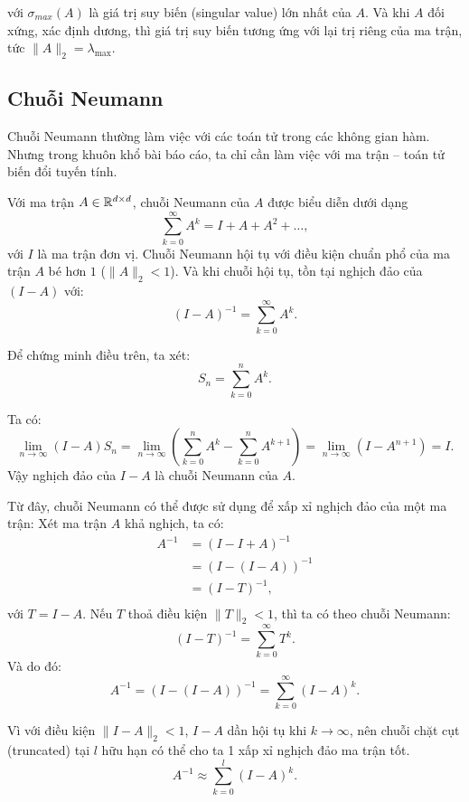với $\sigma_{max} (A)$ là giá trị suy biến (singular value) lớn nhất của $A$. Và khi $A$ đối xứng, xác định dương, thì giá trị suy biến tương ứng với lại trị riêng của ma trận, tức $\|A\|_2 = \lambda_{\max}$.


\subsection{Chuỗi Neumann}
Chuỗi Neumann thường làm việc với các toán tử trong các không gian hàm. Nhưng trong khuôn khổ bài báo cáo, ta chỉ cần làm việc với ma trận -- toán tử biến đổi tuyến tính.

Với ma trận $A \in \mathbb R^{d \times d}$, chuỗi Neumann của $A$ được biểu diễn dưới dạng
\begin{equation*}
    \sum_{k=0}^{\infty} A^k = I + A + A^2 + \dots,
\end{equation*}
với $I$ là ma trận đơn vị.
Chuỗi Neumann hội tụ với điều kiện chuẩn phổ 
của ma trận $A$ bé hơn $1$ ($\|A\|_2 < 1$).
Và khi chuỗi hội tụ, tồn tại nghịch đảo của $(I - A)$ với:
\begin{equation*}
    (I - A)^{-1} = \sum_{k=0}^{\infty} A^k.
\end{equation*}

Để chứng minh điều trên, ta xét:
\[
    S_n = \sum_{k=0}^n A^k.
\]

Ta có:
\[
    \lim_{n \to \infty }(I - A) S_{n}
    =\lim_{n \to \infty} \left(\sum_{k=0}^{n}A^{k} - \sum_{k=0}^{n}A^{k+1}\right)
    =\lim_{n \to \infty} \left(I-A^{n+1}\right) = I.
\]
Vậy nghịch đảo của $I-A$ là chuỗi Neumann của $A$.

Từ đây, chuỗi Neumann có thể được sử dụng để xấp xỉ nghịch đảo của một ma trận: Xét ma trận $A$ khả nghịch, ta có:
\begin{equation*}
    \begin{split}
        A^{-1} &= (I - I + A)^{-1}\\
        &= (I - (I - A))^{-1}\\
        &= (I - T)^{-1}, \\
    \end{split}
\end{equation*}
với $T = I - A$. Nếu $T$ thoả điều kiện $\|T\|_2 < 1$, thì ta có theo chuỗi Neumann:
\[
    (I - T)^{-1} = \sum_{k=0}^{\infty} T^k.  
\]
Và do đó:
\begin{equation*}
    A^{-1} = (I - (I - A))^{-1} = \sum_{k=0}^{\infty} (I - A)^k.
\end{equation*}

Vì với điều kiện $\|I-A\|_2 < 1$, $I-A$ dần hội tụ khi $k \to \infty$, nên chuỗi chặt cụt (truncated) tại $l$ hữu hạn có thể cho ta 1 xấp xỉ nghịch đảo ma trận tốt.
\begin{equation*}
     A^{-1} \approx \sum_{k=0}^{l}(I-A)^{k}.
\end{equation*}



